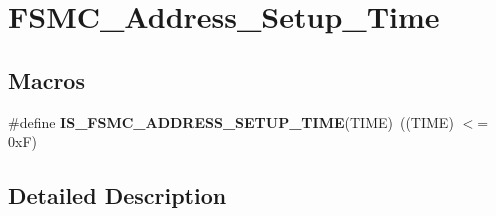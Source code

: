 \hypertarget{group___f_s_m_c___address___setup___time}{\section{F\-S\-M\-C\-\_\-\-Address\-\_\-\-Setup\-\_\-\-Time}
\label{group___f_s_m_c___address___setup___time}
}
\subsection*{Macros}
\begin{DoxyCompactItemize}
\item 
\hypertarget{group___f_s_m_c___address___setup___time_ga8b77d090338011abc1be7f4a420e2d8f}{\#define {\bfseries I\-S\-\_\-\-F\-S\-M\-C\-\_\-\-A\-D\-D\-R\-E\-S\-S\-\_\-\-S\-E\-T\-U\-P\-\_\-\-T\-I\-M\-E}(T\-I\-M\-E)~((T\-I\-M\-E) $<$= 0x\-F)}\label{group___f_s_m_c___address___setup___time_ga8b77d090338011abc1be7f4a420e2d8f}

\end{DoxyCompactItemize}


\subsection{Detailed Description}
